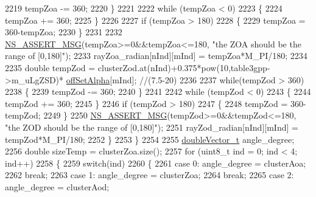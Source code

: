 \begin{DoxyCode}
2219                                 tempZoa -= 360;
2220                         \}
2221 
2222                         \textcolor{keywordflow}{while} (tempZoa < 0)
2223                         \{
2224                                 tempZoa += 360;
2225                         \}
2226 
2227                         \textcolor{keywordflow}{if} (tempZoa > 180)
2228                         \{
2229                                 tempZoa = 360-tempZoa;
2230                         \}
2231 
2232                         \hyperlink{assert_8h_aff5ece9066c74e681e74999856f08539}{NS\_ASSERT\_MSG}(tempZoa>=0&&tempZoa<=180, \textcolor{stringliteral}{"the ZOA should be the range
       of [0,180]"});
2233                         rayZoa\_radian[nInd][mInd] = tempZoa*M\_PI/180;
2234 
2235                         \textcolor{keywordtype}{double} tempZod = clusterZod.at(nInd)+0.375*pow(10,table3gpp->m\_uLgZSD)*
      \hyperlink{namespacens3_a2344173eeb094a196c555a159e87bc6f}{offSetAlpha}[mInd]; \textcolor{comment}{//(7.5-20)}
2236 
2237                         \textcolor{keywordflow}{while}(tempZod > 360)
2238                         \{
2239                                 tempZod -= 360;
2240                         \}
2241 
2242                         \textcolor{keywordflow}{while} (tempZod < 0)
2243                         \{
2244                                 tempZod += 360;
2245                         \}
2246                         \textcolor{keywordflow}{if} (tempZod > 180)
2247                         \{
2248                                 tempZod = 360-tempZod;
2249                         \}
2250                         \hyperlink{assert_8h_aff5ece9066c74e681e74999856f08539}{NS\_ASSERT\_MSG}(tempZod>=0&&tempZod<=180, \textcolor{stringliteral}{"the ZOD should be the range
       of [0,180]"});
2251                         rayZod\_radian[nInd][mInd] = tempZod*M\_PI/180;
2252                 \}
2253         \}
2254 
2255         \hyperlink{namespacens3_aa6f1edf6566ca6afec613bc6e40240ea}{doubleVector\_t} angle\_degree;
2256         \textcolor{keywordtype}{double} sizeTemp = clusterZoa.size();
2257         \textcolor{keywordflow}{for} (uint8\_t ind = 0; ind < 4; ind++)
2258         \{
2259                 \textcolor{keywordflow}{switch}(ind)
2260                 \{
2261                 \textcolor{keywordflow}{case} 0: angle\_degree = clusterAoa;
2262                                 \textcolor{keywordflow}{break};
2263                 \textcolor{keywordflow}{case} 1: angle\_degree = clusterZoa;
2264                                 \textcolor{keywordflow}{break};
2265                 \textcolor{keywordflow}{case} 2: angle\_degree = clusterAod;

\end{DoxyCode}
